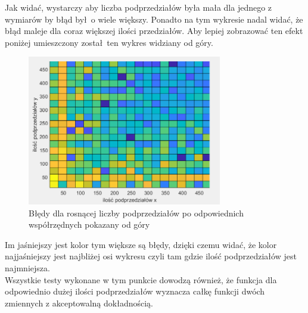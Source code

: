 \documentclass[12pt]{article}
\begin{document}
Jak wida\'c, wystarczy aby liczba podprzedzia\l \'ow by\l a ma\l a dla jednego z wymiar\'ow by b\l ąd by\l  \ o wiele większy.
Ponadto na tym wykresie nadal wida\'c, \.ze b\l ąd maleje dla coraz większej ilo\'sci przedzia\l \'ow.
Aby lepiej zobrazowa\'c ten efekt poni\.zej umieszczony zosta\l \ ten wykres widziany od g\'ory.

\begin{figure}[H]
    \centering
    \includegraphics[width=8.5cm]{3D_2d.png}
    \caption{B\l ędy dla rosnącej liczby podprzedzia\l \'ow po odpowiednich
    wsp\'o\l rzędnych pokazany  od g\'ory}
\end{figure}
Im ja\'sniejszy jest kolor tym większe są b\l ędy, dzięki czemu wida\'c,
\.ze kolor najja\'sniejszy jest najbli\.zej osi wykresu czyli tam gdzie 
ilo\'s\'c podprzedzia\l \'ow jest najmniejsza. \\ 
Wszystkie testy wykonane w tym punkcie dowodzą r\'ownie\.z, \.ze funkcja 
dla odpowiednio du\.zej ilo\'sci podprzedzia\l \'ow wyznacza ca\l kę 
funkcji dw\'och zmiennych z akceptowalną dok\l adno\'scią.
\end{document}
